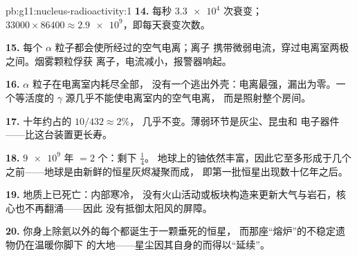 \begin{solution}{pb:g11:nucleus-radioactivity:1}
\textbf{14.} 每秒 $\num{3.3e4}$ 次衰变；
$\num{33000} \times 86400 \approx \num{2.9e9}$，即每天衰变次数。

\textbf{15.} 每个 $\alpha$ 粒子都会使所经过的空气电离；离子
携带微弱电流，穿过电离室两极之间。烟雾颗粒俘获
离子，电流减小，报警器响起。

\textbf{16.} $\alpha$ 粒子在电离室内耗尽全部，
没有一个逃出外壳：电离最强，漏出为零。一个等活度的 $\gamma$
源几乎不能使电离室内的空气电离，
而是照射整个房间。

\textbf{17.} 十年约占的 $10/432 \approx 2\%$，
几乎不变。薄弱环节是灰尘、昆虫和
电子器件——比这台装置更长寿。

\textbf{18.} $\num{9e9}$ 年 $= 2$ 个：剩下 $\frac14$。
地球上的铀依然丰富，因此它至多形成于几个
之前——地球是由新鲜的恒星灰烬凝聚而成，
即第一批恒星出现数十亿年之后。

\textbf{19.} 地质上已死亡：内部寒冷，
没有火山活动或板块构造来更新大气与岩石，核心也不再翻涌——因此
没有抵御太阳风的屏障。

\textbf{20.} 你身上除氦以外的每个都诞生于一颗垂死的恒星，
而那座“熔炉”的不稳定遗物仍在温暖你脚下
的大地——星尘因其自身的而得以“延续”。
\end{solution}
